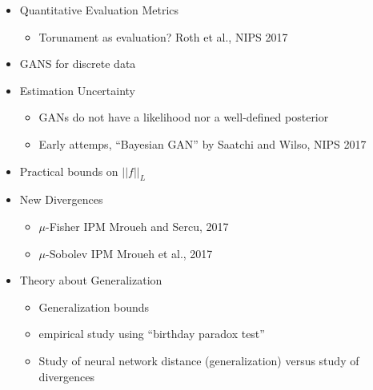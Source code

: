 \documentclass[b5paper]{report}
\begin{document}
\begin{itemize}
  \item Quantitative Evaluation Metrics
    \begin{itemize}
      \item Torunament as evaluation? Roth et al., NIPS 2017 \cite{roth2017stabilizing}
    \end{itemize}
  \item GANS for discrete data
  \item Estimation Uncertainty
    \begin{itemize}
      \item GANs do not have a likelihood nor a well-defined posterior
      \item Early attemps, ``Bayesian GAN'' by Saatchi and Wilso, NIPS 2017
        \cite{saatci2017bayesian}
    \end{itemize}
  \item Practical bounds on $||f||_L$
  \item New Divergences
    \begin{itemize}
      \item $\mu$-Fisher IPM Mroueh and Sercu, 2017
      \item $\mu$-Sobolev IPM Mroueh et al., 2017 \cite{mroueh2017sobolev}
    \end{itemize}
  \item Theory about Generalization
    \begin{itemize}
      \item Generalization bounds
      \item empirical study using ``birthday paradox test''
      \item Study of neural network distance (generalization) versus study of
        divergences
    \end{itemize}
\end{itemize}
\end{document}
